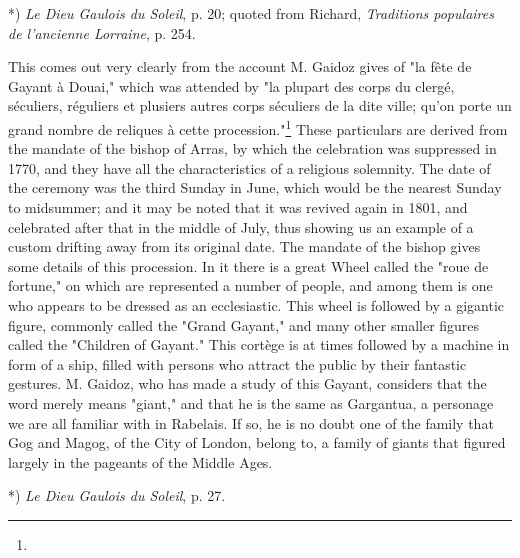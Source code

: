 \documentclass[a4paper, 11pt, oneside, polutonikogreek, english]{article}
\begin{document}
*) \emph{Le Dieu Gaulois du Soleil}, p. 20; quoted from Richard, \emph{Traditions populaires de l'ancienne Lorraine}, p. 254.

This comes out very clearly from the account M. Gaidoz gives of "la fête de Gayant à Douai," which was attended by "la plupart des corps du clergé, séculiers, réguliers et plusiers autres corps séculiers de la dite ville; qu'on porte un grand nombre de reliques à cette procession."\footnote{} These particulars are derived from the mandate of the bishop of Arras, by which the celebration was suppressed in 1770, and they have all the characteristics of a religious solemnity. The date of the ceremony was the third Sunday in June, which would be the nearest Sunday to midsummer; and it may be noted that it was revived again in 1801, and celebrated after that in the middle of July, thus showing us an example of a custom drifting away from its original date. The mandate of the bishop gives some details of this procession. In it there is a great Wheel called the "roue de fortune," on which are represented a number of people, and among them is one who appears to be dressed as an ecclesiastic. This wheel is followed by a gigantic figure, commonly called the "Grand Gayant," and many other smaller figures called the "Children of Gayant." This cortège is at times followed by a machine in form of a ship, filled with persons who attract the public by their fantastic gestures. M. Gaidoz, who has made a study of this Gayant, considers that the word merely means "giant," and that he is the same as Gargantua, a personage we are all familiar with in Rabelais. If so, he is no doubt one of the family that Gog and Magog, of the City of London, belong to, a family of giants that figured largely in the pageants of the Middle Ages.

*) \emph{Le Dieu Gaulois du Soleil}, p. 27.
\end{document}
